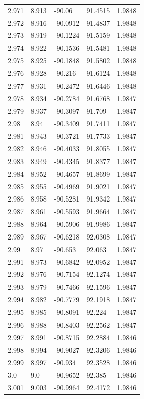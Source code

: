 \begin{tabular}{lllll}
2.971 & 8.913 & -90.06 & 91.4515 & 1.9848 \\
2.972 & 8.916 & -90.0912 & 91.4837 & 1.9848 \\
2.973 & 8.919 & -90.1224 & 91.5159 & 1.9848 \\
2.974 & 8.922 & -90.1536 & 91.5481 & 1.9848 \\
2.975 & 8.925 & -90.1848 & 91.5802 & 1.9848 \\
2.976 & 8.928 & -90.216 & 91.6124 & 1.9848 \\
2.977 & 8.931 & -90.2472 & 91.6446 & 1.9848 \\
2.978 & 8.934 & -90.2784 & 91.6768 & 1.9847 \\
2.979 & 8.937 & -90.3097 & 91.709 & 1.9847 \\
2.98 & 8.94 & -90.3409 & 91.7411 & 1.9847 \\
2.981 & 8.943 & -90.3721 & 91.7733 & 1.9847 \\
2.982 & 8.946 & -90.4033 & 91.8055 & 1.9847 \\
2.983 & 8.949 & -90.4345 & 91.8377 & 1.9847 \\
2.984 & 8.952 & -90.4657 & 91.8699 & 1.9847 \\
2.985 & 8.955 & -90.4969 & 91.9021 & 1.9847 \\
2.986 & 8.958 & -90.5281 & 91.9342 & 1.9847 \\
2.987 & 8.961 & -90.5593 & 91.9664 & 1.9847 \\
2.988 & 8.964 & -90.5906 & 91.9986 & 1.9847 \\
2.989 & 8.967 & -90.6218 & 92.0308 & 1.9847 \\
2.99 & 8.97 & -90.653 & 92.063 & 1.9847 \\
2.991 & 8.973 & -90.6842 & 92.0952 & 1.9847 \\
2.992 & 8.976 & -90.7154 & 92.1274 & 1.9847 \\
2.993 & 8.979 & -90.7466 & 92.1596 & 1.9847 \\
2.994 & 8.982 & -90.7779 & 92.1918 & 1.9847 \\
2.995 & 8.985 & -90.8091 & 92.224 & 1.9847 \\
2.996 & 8.988 & -90.8403 & 92.2562 & 1.9847 \\
2.997 & 8.991 & -90.8715 & 92.2884 & 1.9846 \\
2.998 & 8.994 & -90.9027 & 92.3206 & 1.9846 \\
2.999 & 8.997 & -90.934 & 92.3528 & 1.9846 \\
3.0 & 9.0 & -90.9652 & 92.385 & 1.9846 \\
3.001 & 9.003 & -90.9964 & 92.4172 & 1.9846 \\

\end{tabular}
